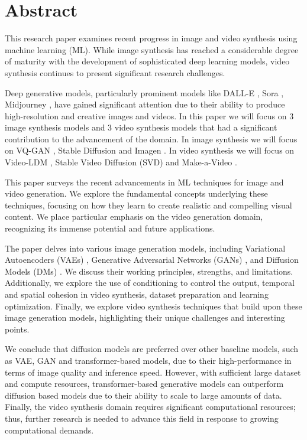 \section{Abstract}

This research paper examines recent progress in image and video synthesis using machine learning (ML). While image synthesis has reached a considerable degree of maturity with the development of sophisticated deep learning models, video synthesis continues to present significant research challenges.

Deep generative models, particularly prominent models like DALL-E \cite{dalle}, Sora \cite{sora_website}, Midjourney \cite{midjourney-website}, have gained significant attention due to their ability to produce high-resolution and creative images and videos. In this paper we will focus on 3 image synthesis models and 3 video synthesis models that had a significant contribution to the advancement of the domain. In image synthesis we will focus on VQ-GAN \cite{vqgan}, Stable Diffusion \cite{stable_diffusion} and Imagen \cite{imagen}. In video synthesis we will focus on Video-LDM \cite{video_ldm}, Stable Video Diffusion (SVD) \cite{stable_video_diffusion} and Make-a-Video \cite{make_a_video}.

This paper surveys the recent advancements in ML techniques for image and video generation. We explore the fundamental concepts underlying these techniques, focusing on how they learn to create realistic and compelling visual content. We place particular emphasis on the video generation domain, recognizing its immense potential and future applications.

The paper delves into various image generation models, including Variational Autoencoders (VAEs) \cite{vae}, Generative Adversarial Networks (GANs) \cite{gan}, and Diffusion Models (DMs) \cite{ddpm}. We discuss their working principles, strengths, and limitations. Additionally, we explore the use of conditioning to control the output, temporal and spatial cohesion in video synthesis, dataset preparation and learning optimization. Finally, we explore video synthesis techniques that build upon these image generation models, highlighting their unique challenges and interesting points.

We conclude that diffusion models are preferred over other baseline models, such as VAE, GAN and transformer-based models, due to their high-performance in terms of image quality and inference speed. However, with sufficient large dataset and compute resources, transformer-based generative models can outperform diffusion based models due to their ability to scale to large amounts of data. Finally, the video synthesis domain requires significant computational resources; thus, further research is needed to advance this field in response to growing computational demands.
